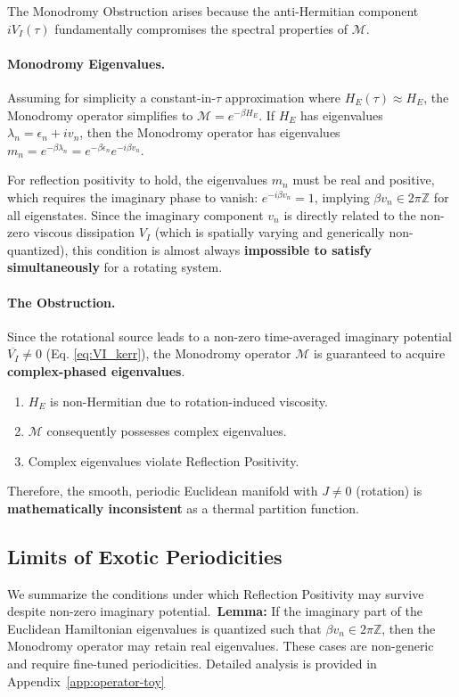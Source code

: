\documentclass[11pt]{article}
\begin{document}
The Monodromy Obstruction arises because the anti-Hermitian component $iV_I(\tau)$ fundamentally compromises the spectral properties of $\mathcal{M}$.

\paragraph{Monodromy Eigenvalues.}
Assuming for simplicity a constant-in-$\tau$ approximation where $H_E(\tau) \approx H_E$, the Monodromy operator simplifies to $\mathcal{M} = e^{-\beta H_E}$. If $H_E$ has eigenvalues $\lambda_n = \epsilon_n + i v_n$, then the Monodromy operator has eigenvalues $m_n = e^{-\beta \lambda_n} = e^{-\beta \epsilon_n} e^{-i \beta v_n}$.

For reflection positivity to hold, the eigenvalues $m_n$ must be real and positive, which requires the imaginary phase to vanish: $e^{-i\beta v_n}=1$, implying $\beta v_n \in 2\pi\mathbb Z$ for all eigenstates. Since the imaginary component $v_n$ is directly related to the non-zero viscous dissipation $V_I$ (which is spatially varying and generically non-quantized), this condition is almost always \textbf{impossible to satisfy simultaneously} for a rotating system.

\paragraph{The Obstruction.}
Since the rotational source leads to a non-zero time-averaged imaginary potential $\overline{V_I} \neq 0$ (Eq. \ref{eq:VI_kerr}), the Monodromy operator $\mathcal{M}$ is guaranteed to acquire \textbf{complex-phased eigenvalues}.

\begin{enumerate}
    \item $H_E$ is non-Hermitian due to rotation-induced viscosity.
    \item $\mathcal{M}$ consequently possesses complex eigenvalues.
    \item Complex eigenvalues violate Reflection Positivity\cite{OsterwalderSchrader1973}.
\end{enumerate}
Therefore, the smooth, periodic Euclidean manifold with $J \neq 0$ (rotation) is \textbf{mathematically inconsistent} as a thermal partition function.

\subsection{Limits of Exotic Periodicities}\label{sec:exotic_periodicities}
We summarize the conditions under which Reflection Positivity may survive despite non-zero imaginary potential.\
\textbf{Lemma:} If the imaginary part of the Euclidean Hamiltonian eigenvalues is quantized such that $\beta v_n \in 2\pi\mathbb{Z}$, then the Monodromy operator may retain real eigenvalues.
These cases are non-generic and require fine-tuned periodicities. Detailed analysis is provided in Appendix~\ref{app:operator-toy}
\end{document}
